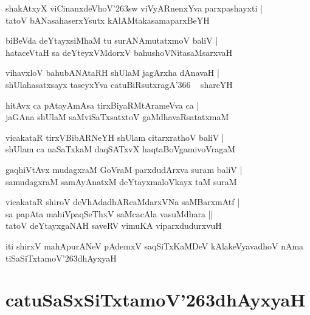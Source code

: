 \documentclass[twoside,12pt,openright]{book}
\def\S{\char'263}
\newcounter{shloka}[chapter]
\begin{document}
\begin{shloka}%
shakAtxyX viCinanxdeVhoV\S sw viVyARnenxYva parxpashayxti |\\
tatoV bANasahaserxYsutx kAlAMtakasamaparxBeYH
\end{shloka}

\begin{shloka}%
biBeVda deYtayxsiMhaM tu surANAmutatxmoV baliV |\\
hataceVtaH sa deYteyxVMdorxV bahushoVNitasaMsarxvaH 
\end{shloka}

\begin{shloka}%
vihavxloV bahubANAtaRH shUlaM jagArxha dAnavaH |\\
shUlahasatxsayx taseyxYva catuBiRsutxragA\char'366 ~ shareYH 
\end{shloka}

\begin{shloka}%
hitAvx ca pAtayAmAsa tirxBiyaRMtArameVva ca |\\
jaGAna shUlaM saMviSaTxsatxtoV gaMdhavaRsatatxmaM
\end{shloka}

\begin{shloka}%
vicakataR tirxVBibARNeYH shUlam citarxrathoV baliV |\\
shUlam ca naSaTxkaM daqSATxvX haqtaBoVgamivoVragaM 
\end{shloka}

\begin{shloka}%
gaqhiVtAvx mudagxraM GoVraM parxdudArxva suram baliV |\\
samudagxraM samAyAnatxM deYtayxmaloVkayx taM suraM 
\end{shloka}

\begin{shloka}%
vicakataR shiroV deVhAdadhARcaMdarxVNa saMBarxmAtf |\\
sa papAta mahiVpaqSeThxV saMcacAla vasuMdhara ||\\
tatoV deYtayxgaNAH saveRV vimuKA viparxdudurxvuH 
\end{shloka}

\begin{center}
iti shirxV mahApurANeV pAdemxV saqSiTxKaMDeV kAlakeVyavadhoV nAma tiSaSiTxtamoV\S dhAyxyaH
\end{center}

\chapter{catuSaSxSiTxtamoV\S dhAyxyaH}
\end{document}
